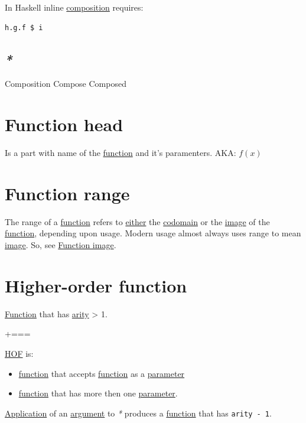 \documentclass[a4paper,14pt,oneside]{book}
\newcommand{\additional}{{\scriptsize +===}}    %
\begin{document}
In Haskell inline \hyperref[orgc4a089b]{composition} requires:
\begin{verbatim}
h.g.f $ i
\end{verbatim}

\subsection{\emph{*}}
\label{sec:orgbc14c2a}

\label{org907e50b}Composition
\label{org217655a}Compose
\label{org6f45998}Composed

\section{\label{org9fe6ada}Function head}
\label{sec:org63d31ab}
Is a part with name of the \hyperref[orgc39a15c]{function} and it's paramenters.
AKA: \(f(x)\)

\section{\label{org966aaba}Function range}
\label{sec:org7def6f0}
The range of a \hyperref[orgc39a15c]{function} refers to \hyperref[orga12ce59]{either} the \hyperref[orgc81ff1a]{codomain} or the \hyperref[orgd75a795]{image} of the \hyperref[orgc39a15c]{function}, depending upon usage. Modern usage almost always uses range to mean \hyperref[orgd75a795]{image}.
So, see \hyperref[org4df5944]{Function image}.

\section{\label{orgd4bfd3e}Higher-order function}
\label{sec:org1872edc}
\hyperref[orgc39a15c]{Function} that has \hyperref[org6e269b0]{arity} > 1.

\additional

\hyperref[org70d38db]{HOF} is:
\begin{itemize}
\item \hyperref[orgc39a15c]{function} that accepts \hyperref[orgc39a15c]{function} as a \hyperref[org08c9428]{parameter}
\item \hyperref[orgc39a15c]{function} that has more then one \hyperref[org08c9428]{parameter}.
\end{itemize}

\hyperref[orgb96b365]{Application} of an \hyperref[org7be5baf]{argument} to \emph{*} produces a \hyperref[orgc39a15c]{function} that has \texttt{arity - 1}.
\end{document}
